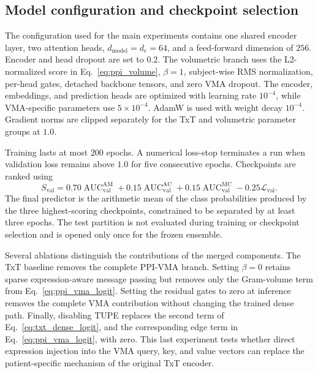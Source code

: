 \subsection{Model configuration and checkpoint selection}

The configuration used for the main experiments contains one shared encoder layer, two attention heads, \(d_{\mathrm{model}}=d_e=64\), and a feed-forward dimension of \(256\). Encoder and head dropout are set to \(0.2\). The volumetric branch uses the L2-normalized score in Eq.~\eqref{eq:ppi_volume}, \(\beta=1\), subject-wise RMS normalization, per-head gates, detached backbone tensors, and zero VMA dropout. The encoder, embeddings, and prediction heads are optimized with learning rate \(10^{-4}\), while VMA-specific parameters use \(5\times10^{-4}\). AdamW is used with weight decay \(10^{-4}\). Gradient norms are clipped separately for the TxT and volumetric parameter groups at \(1.0\).

Training lasts at most \(200\) epochs. A numerical loss-stop terminates a run when validation loss remains above \(1.0\) for five consecutive epochs. Checkpoints are ranked using
\begin{equation}
    S_{\mathrm{val}}
    =0.70\operatorname{AUC}^{\mathrm{AM}}_{\mathrm{val}}
    +0.15\operatorname{AUC}^{\mathrm{AC}}_{\mathrm{val}}
    +0.15\operatorname{AUC}^{\mathrm{MC}}_{\mathrm{val}}
    -0.25\mathcal{L}_{\mathrm{val}}.
\end{equation}
The final predictor is the arithmetic mean of the class probabilities produced by the three highest-scoring checkpoints, constrained to be separated by at least three epochs. The test partition is not evaluated during training or checkpoint selection and is opened only once for the frozen ensemble.

Several ablations distinguish the contributions of the merged components. The TxT baseline removes the complete PPI-VMA branch. Setting \(\beta=0\) retains sparse expression-aware message passing but removes only the Gram-volume term from Eq.~\eqref{eq:ppi_vma_logit}. Setting the residual gates to zero at inference removes the complete VMA contribution without changing the trained dense path. Finally, disabling TUPE replaces the second term of Eq.~\eqref{eq:txt_dense_logit}, and the corresponding edge term in Eq.~\eqref{eq:ppi_vma_logit}, with zero. This last experiment tests whether direct expression injection into the VMA query, key, and value vectors can replace the patient-specific mechanism of the original TxT encoder.
